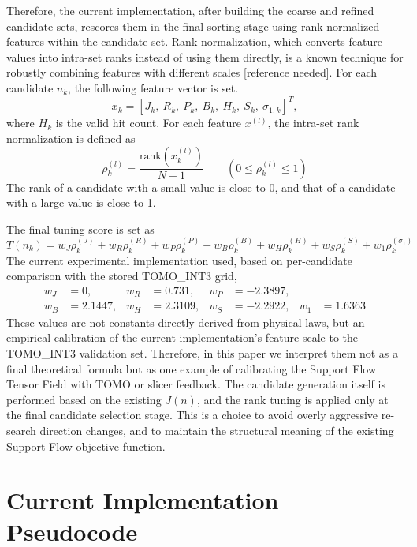 \documentclass[11pt,a4paper]{article}
\begin{document}
Therefore, the current implementation, after building the coarse and refined candidate sets,
rescores them in the final sorting stage using rank-normalized features within the candidate set.
Rank normalization, which converts feature values into intra-set ranks instead of using them directly,
is a known technique for robustly combining features with different scales [reference needed].
For each candidate $n_k$, the following feature vector is set.
\begin{equation}
x_k
=
\left[
J_k,\ R_k,\ P_k,\ B_k,\ H_k,\ S_k,\ \sigma_{1,k}
\right]^T ,
\end{equation}
where $H_k$ is the valid hit count.
For each feature $x^{(l)}$, the intra-set rank normalization is defined as
\begin{equation}
\rho^{(l)}_k
=
\frac{\mathrm{rank}(x^{(l)}_k)}{N-1}
\qquad
\left(0\le \rho^{(l)}_k\le 1\right)
\end{equation}
The rank of a candidate with a small value is close to 0, and that of a candidate with a large value is close to 1.

The final tuning score is set as
\begin{equation}
T(n_k)
=
w_J\rho^{(J)}_k
+w_R\rho^{(R)}_k
+w_P\rho^{(P)}_k
+w_B\rho^{(B)}_k
+w_H\rho^{(H)}_k
+w_S\rho^{(S)}_k
+w_1\rho^{(\sigma_1)}_k
\end{equation}
The current experimental implementation used, based on per-candidate comparison with the stored TOMO\_INT3 grid,
\begin{equation}
\begin{aligned}
w_J&=0, &
w_R&=0.731, &
w_P&=-2.3897,\\
w_B&=2.1447, &
w_H&=2.3109, &
w_S&=-2.2922, &
w_1&=1.6363
\end{aligned}
\end{equation}
These values are not constants directly derived from physical laws, but
an empirical calibration of the current implementation's feature scale to the TOMO\_INT3 validation set.
Therefore, in this paper we interpret them not as a final theoretical formula but
as one example of calibrating the Support Flow Tensor Field with TOMO or slicer feedback.
The candidate generation itself is performed based on the existing $J(n)$,
and the rank tuning is applied only at the final candidate selection stage.
This is a choice to avoid overly aggressive re-search direction changes,
and to maintain the structural meaning of the existing Support Flow objective function.

\section{Current Implementation Pseudocode}
\end{document}
